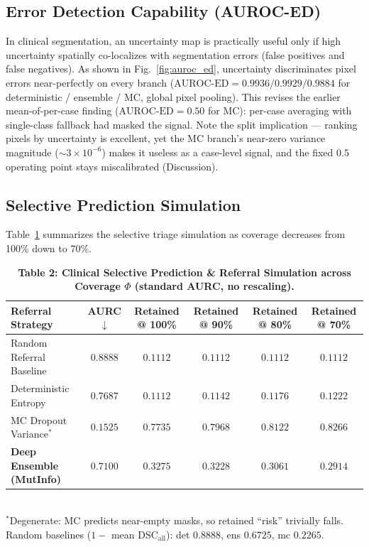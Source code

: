 \documentclass[11pt,a4paper]{article}
\begin{document}
\subsection{Error Detection Capability (AUROC-ED)}
In clinical segmentation, an uncertainty map is practically useful only if high uncertainty spatially co-localizes with segmentation errors (false positives and false negatives). As shown in Fig.~\ref{fig:auroc_ed}, uncertainty discriminates pixel errors near-perfectly on every branch ($\text{AUROC-ED} = 0.9936 / 0.9929 / 0.9884$ for deterministic / ensemble / MC, global pixel pooling). This revises the earlier mean-of-per-case finding ($\text{AUROC-ED} = 0.50$ for MC): per-case averaging with single-class fallback had masked the signal. Note the split implication — ranking pixels by uncertainty is excellent, yet the MC branch's near-zero variance magnitude ($\sim$$3 \times 10^{-6}$) makes it useless as a case-level signal, and the fixed $0.5$ operating point stays miscalibrated (Discussion).

\subsection{Selective Prediction Simulation}
Table~\ref{tab:selective} summarizes the selective triage simulation as coverage decreases from 100\% down to 70\%.

\begin{table}[t]
\centering
\small
\caption{\textbf{Table 2: Clinical Selective Prediction \& Referral Simulation across Coverage $\Phi$ (standard AURC, no rescaling).}}
\label{tab:selective}
\begin{tabularx}{\linewidth}{l c c c c c}
\toprule
\textbf{Referral Strategy} & \textbf{AURC} $\downarrow$ & \textbf{Retained @ 100\%} & \textbf{Retained @ 90\%} & \textbf{Retained @ 80\%} & \textbf{Retained @ 70\%} \\
\midrule
Random Referral Baseline & $0.8888$ & $0.1112$ & $0.1112$ & $0.1112$ & $0.1112$ \\
Deterministic Entropy & $0.7687$ & $0.1112$ & $0.1142$ & $0.1176$ & $0.1222$ \\
MC Dropout Variance$^*$ & $0.1525$ & $0.7735$ & $0.7968$ & $0.8122$ & $0.8266$ \\
\textbf{Deep Ensemble (MutInfo)} & $\mathbf{0.7100}$ & $\mathbf{0.3275}$ & $\mathbf{0.3228}$ & $\mathbf{0.3061}$ & $\mathbf{0.2914}$ \\
\bottomrule
\end{tabularx}
\\[2pt]
{\footnotesize $^*$Degenerate: MC predicts near-empty masks, so retained ``risk'' trivially falls. Random baselines ($1 - $ mean $\text{DSC}_{\text{all}}$): det $0.8888$, ens $0.6725$, mc $0.2265$.}
\end{table}
\end{document}
